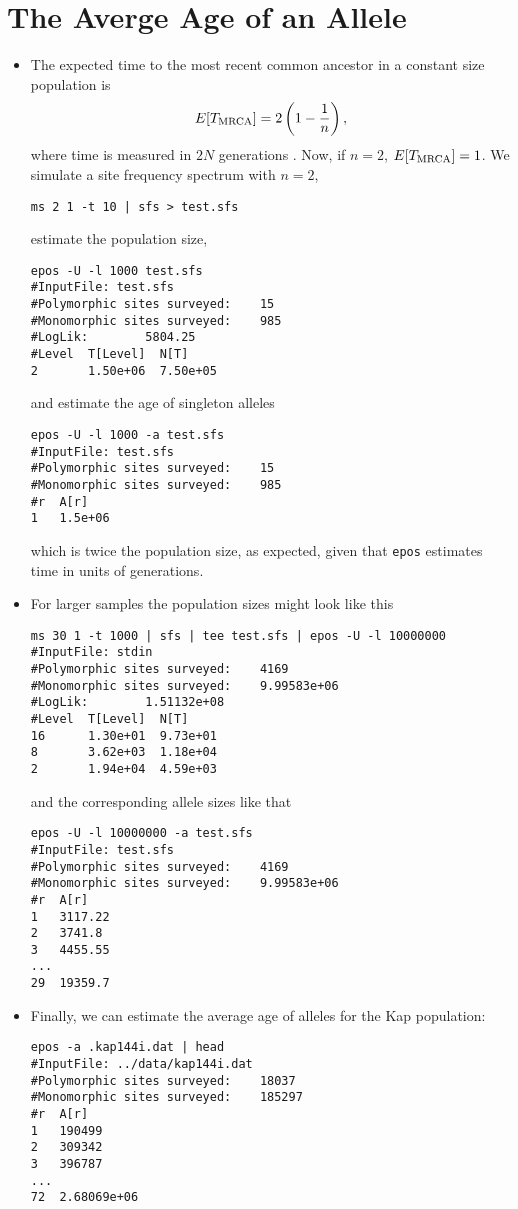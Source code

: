 \documentclass[a4paper]{article}
\newcommand{\ty}{\texttt}
\begin{document}
\section{The Averge Age of an Allele}
\begin{itemize}
  \item The expected
    time to the most recent common
    ancestor in a constant size population is
    \[
    E[T_{\rm MRCA}]=2\left(1-\frac{1}{n}\right),
    \]
    where time is measured in $2N$
    generations  \citep[p.76]{wak09:coa}. Now, if $n=2$, $E[T_{\rm
        MRCA}]=1$. We simulate a site frequency spectrum with $n=2$,
\begin{verbatim}
ms 2 1 -t 10 | sfs > test.sfs
\end{verbatim}
estimate the population size,
\begin{verbatim}
epos -U -l 1000 test.sfs
#InputFile:	test.sfs
#Polymorphic sites surveyed:	15
#Monomorphic sites surveyed:	985
#LogLik:		5804.25
#Level  T[Level]  N[T]
2       1.50e+06  7.50e+05
\end{verbatim}
and estimate the age of singleton alleles
\begin{verbatim}
epos -U -l 1000 -a test.sfs
#InputFile:	test.sfs
#Polymorphic sites surveyed:	15
#Monomorphic sites surveyed:	985
#r  A[r]
1   1.5e+06
\end{verbatim}
which is twice the population size, as expected, given that
\ty{epos} estimates time in units of generations.
\item For larger samples the population sizes might look like this
\begin{verbatim}
ms 30 1 -t 1000 | sfs | tee test.sfs | epos -U -l 10000000 
#InputFile:	stdin
#Polymorphic sites surveyed:	4169
#Monomorphic sites surveyed:	9.99583e+06
#LogLik:		1.51132e+08
#Level  T[Level]  N[T]
16      1.30e+01  9.73e+01
8       3.62e+03  1.18e+04
2       1.94e+04  4.59e+03
\end{verbatim}
and the corresponding allele sizes like that
\begin{verbatim}
epos -U -l 10000000 -a test.sfs 
#InputFile:	test.sfs
#Polymorphic sites surveyed:	4169
#Monomorphic sites surveyed:	9.99583e+06
#r  A[r]
1   3117.22
2   3741.8
3   4455.55
...
29  19359.7
\end{verbatim}
\item Finally, we can estimate the average age of alleles for the Kap
  population:
\begin{verbatim}
epos -a .kap144i.dat | head
#InputFile:	../data/kap144i.dat
#Polymorphic sites surveyed:	18037
#Monomorphic sites surveyed:	185297
#r  A[r]
1   190499
2   309342
3   396787
...
72  2.68069e+06
\end{verbatim}  
\end{itemize}
\end{document}
